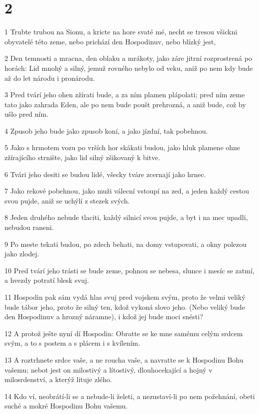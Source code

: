 \chapter{2}

\par 1 Trubte trubou na Sionu, a kricte na hore svaté mé, necht se tresou všickni obyvatelé této zeme, nebo prichází den Hospodinuv, nebo blízký jest,
\par 2 Den temnosti a mracna, den oblaku a mrákoty, jako záre jitrní rozprostrená po horách: Lid mnohý a silný, jemuž rovného nebylo od veku, aniž po nem kdy bude až do let národu i pronárodu.
\par 3 Pred tvárí jeho ohen zžírati bude, a za ním plamen plápolati; pred ním zeme tato jako zahrada Eden, ale po nem bude poušt prehrozná, a aniž bude, což by ušlo pred ním.
\par 4 Zpusob jeho bude jako zpusob koní, a jako jízdní, tak pobehnou.
\par 5 Jako s hrmotem vozu po vrších hor skákati budou, jako hluk plamene ohne zžírajícího strnište, jako lid silný zšikovaný k bitve.
\par 6 Tvári jeho desiti se budou lidé, všecky tváre zcernají jako hrnec.
\par 7 Jako rekové pobehnou, jako muži válecní vstoupí na zed, a jeden každý cestou svou pujde, aniž se uchýlí z stezek svých.
\par 8 Jeden druhého nebude tlaciti, každý silnicí svou pujde, a byt i na mec upadli, nebudou raneni.
\par 9 Po meste tekati budou, po zdech behati, na domy vstupovati, a okny polezou jako zlodej.
\par 10 Pred tvárí jeho trásti se bude zeme, pohnou se nebesa, slunce i mesíc se zatmí, a hvezdy potratí blesk svuj.
\par 11 Hospodin pak sám vydá hlas svuj pred vojskem svým, proto že velmi veliký bude tábor jeho, proto že silný ten, kdož vykoná slovo jeho. (Nebo veliký bude den Hospodinuv a hrozný náramne), i kdož jej bude moci snésti?
\par 12 A protož ješte nyní dí Hospodin: Obratte se ke mne samému celým srdcem svým, a to s postem a s plácem i s kvílením.
\par 13 A roztrhnete srdce vaše, a ne roucha vaše, a navratte se k Hospodinu Bohu vašemu; nebot jest on milostivý a lítostivý, dlouhocekající a hojný v milosrdenství, a kterýž lituje zlého.
\par 14 Kdo ví, neobrátí-li se a nebude-li želeti, a nezustaví-li po nem požehnání, obeti suché a mokré Hospodinu Bohu vašemu.
